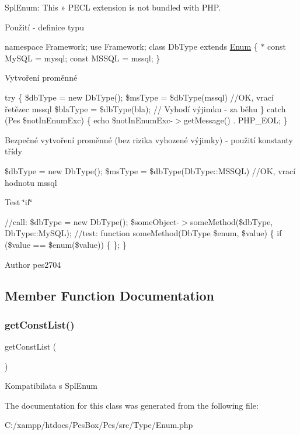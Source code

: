 Spl\+Enum\+: This » P\+E\+CL extension is not bundled with P\+HP.

Použití -\/ definice typu

{\ttfamily  namespace Framework; use Framework; class Db\+Type extends \mbox{\hyperlink{class_pes_1_1_type_1_1_enum}{Enum}} \{ $\ast$ const My\+S\+QL = \textquotesingle{}mysql\textquotesingle{}; const M\+S\+S\+QL = \textquotesingle{}mssql\textquotesingle{}; \} } 

Vytvoření proměnné

{\ttfamily  try \{ \$db\+Type = new Db\+Type(); \$ms\+Type = \$db\+Type(\textquotesingle{}mssql\textquotesingle{}) //\+OK, vrací řetězec \textquotesingle{}mssql\textquotesingle{} \$bla\+Type = \$db\+Type(\textquotesingle{}bla\textquotesingle{}); // Vyhodí výjimku -\/ za běhu \} catch (Pes \$not\+In\+Enum\+Exc) \{ echo \$not\+In\+Enum\+Exc-\/$>$get\+Message() . P\+H\+P\+\_\+\+E\+OL; \} } 

Bezpečné vytvoření proměnné (bez rizika vyhozené výjimky) -\/ použití konstanty třídy

{\ttfamily  \$db\+Type = new Db\+Type(); \$ms\+Type = \$db\+Type(\+Db\+Type\+::\+M\+S\+S\+Q\+L) //\+OK, vrací hodnotu \textquotesingle{}mssql\textquotesingle{} } 

Test \char`\"{}if\char`\"{}

{\ttfamily  //call\+: \$db\+Type = new Db\+Type(); \$some\+Object-\/$>$some\+Method(\$db\+Type, Db\+Type\+::\+My\+S\+QL); //test\+: function some\+Method(Db\+Type \$enum, \$value) \{ if (\$value == \$enum(\$value)) \{ \}; \} } \begin{DoxyAuthor}{Author}
pes2704 
\end{DoxyAuthor}


\subsection{Member Function Documentation}
\mbox{\label{class_pes_1_1_type_1_1_enum_a922c1b7210fe6ace59e7be671f91062e}} 
\subsubsection{\texorpdfstring{get\+Const\+List()}{getConstList()}}
{\footnotesize\ttfamily get\+Const\+List (\begin{DoxyParamCaption}{ }\end{DoxyParamCaption})}

Kompatibilata s Spl\+Enum 

The documentation for this class was generated from the following file\+:\begin{DoxyCompactItemize}
\item 
C\+:/xampp/htdocs/\+Pes\+Box/\+Pes/src/\+Type/Enum.\+php\end{DoxyCompactItemize}
